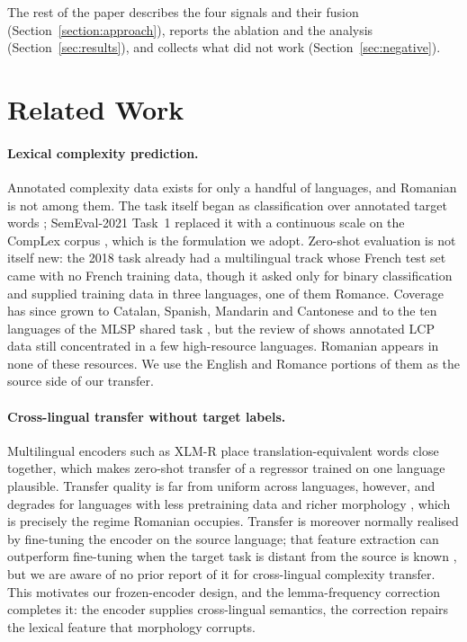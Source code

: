 The rest of the paper describes the four signals and their fusion
(Section~\ref{section:approach}), reports the ablation and the analysis
(Section~\ref{sec:results}), and collects what did not work
(Section~\ref{sec:negative}).


\section{Related Work}
\label{sec:related}

\paragraph{Lexical complexity prediction.}
Annotated complexity data exists for only a handful of languages, and
Romanian is not among them. The task itself began as classification over
annotated target words \citep{yimam-etal-2018-report}; SemEval-2021
Task~1 replaced it with a continuous scale on the CompLex corpus
\citep{shardlow-etal-2021-semeval}, which is the formulation we adopt.
Zero-shot evaluation is not itself new: the 2018 task already had a
multilingual track whose French test set came with no French training
data, though it asked only for binary classification and supplied
training data in three languages, one of them Romance. Coverage has since
grown to
Catalan, Spanish, Mandarin and Cantonese
\citep{saggion-etal-2024-lexical, qiu-etal-2024-complex} and to the ten
languages of the MLSP shared task \citep{shardlow-etal-2024-bea}, but the
review of \citet{shardlow-etal-2024-multilingual} shows annotated LCP
data still concentrated in a few high-resource languages. Romanian
appears in none of these resources. We use the English and Romance
portions of them as the source side of our transfer.

\paragraph{Cross-lingual transfer without target labels.}
Multilingual encoders such as XLM-R \citep{conneau2020xlmr} place
translation-equivalent words close together, which makes zero-shot
transfer of a regressor trained on one language plausible. Transfer
quality is far from uniform across languages, however, and degrades for
languages with less pretraining data and richer morphology
\citep{pires-etal-2019-multilingual, wu-dredze-2020-languages}, which is
precisely the regime Romanian occupies. Transfer is moreover normally
realised by fine-tuning the encoder on the source language; that feature
extraction can outperform fine-tuning when the target task is distant
from the source is known \citep{peters-etal-2019-tune}, but we are aware
of no prior report of it for cross-lingual complexity transfer. This
motivates our frozen-encoder design, and the lemma-frequency correction
completes it: the encoder supplies cross-lingual semantics, the
correction repairs the lexical feature that morphology corrupts.

